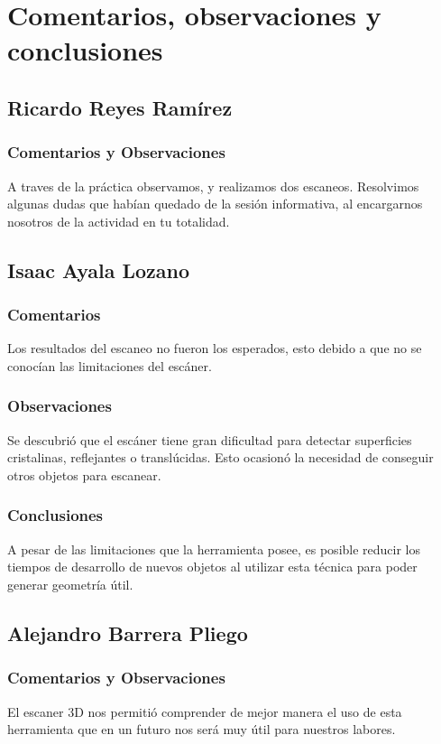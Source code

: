 \section{Comentarios, observaciones y conclusiones}
\subsection{Ricardo Reyes Ram\'irez}
\subsubsection{Comentarios y Observaciones}
A traves de la pr\'actica observamos, y realizamos dos escaneos. Resolvimos algunas dudas que hab\'ian quedado
de la sesi\'on informativa, al encargarnos nosotros de la actividad en tu totalidad.

\subsection{Isaac Ayala Lozano}
\subsubsection{Comentarios}
Los resultados del escaneo no fueron los esperados, esto debido a que no se conoc\'ian las limitaciones del esc\'aner.

\subsubsection{Observaciones}
Se descubri\'o que el esc\'aner tiene gran dificultad para detectar superficies cristalinas, reflejantes o transl\'ucidas.
Esto ocasion\'o la necesidad de conseguir otros objetos para escanear.

\subsubsection{Conclusiones}
A pesar de las limitaciones que la herramienta posee, es posible reducir los tiempos de desarrollo de nuevos objetos
al utilizar esta t\'ecnica para poder generar geometr\'ia \'util.

\subsection{Alejandro Barrera Pliego}
\subsubsection{Comentarios y Observaciones}
El escaner 3D nos permiti\'o comprender de mejor manera el uso de esta herramienta que en un futuro nos ser\'a
muy \'util para nuestros labores.

